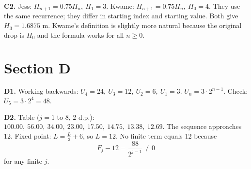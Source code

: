 \documentclass[12pt,a4paper]{article}
\begin{document}
\medskip
\textbf{C2.}  
Jess: \(H_{n+1}=0.75H_n,\ H_1=3\).  
Kwame: \(H_{n+1}=0.75H_n,\ H_0=4\).  
They use the same recurrence; they differ in starting index and starting value.  
Both give \(H_3 = 1.6875\) m.  
Kwame's definition is slightly more natural because the original drop is \(H_0\) and the formula works for all \(n\ge 0\).

\section*{Section D}

\textbf{D1.} Working backwards: \(U_4=24,\ U_3=12,\ U_2=6,\ U_1=3\).  
\(U_n = 3\cdot 2^{n-1}\).  
Check: \(U_5 = 3\cdot 2^4 = 48\).

\medskip
\textbf{D2.} Table ($j=1$ to $8$, 2 d.p.): \(100.00,\ 56.00,\ 34.00,\ 23.00,\ 17.50,\ 14.75,\ 13.38,\ 12.69\).  
The sequence approaches 12.  
Fixed point: \(L=\frac{L}{2}+6\), so \(L=12\).  
No finite term equals 12 because
\[
F_j - 12 = \frac{88}{2^{j-1}} \neq 0
\]
for any finite \(j\).
\end{document}
